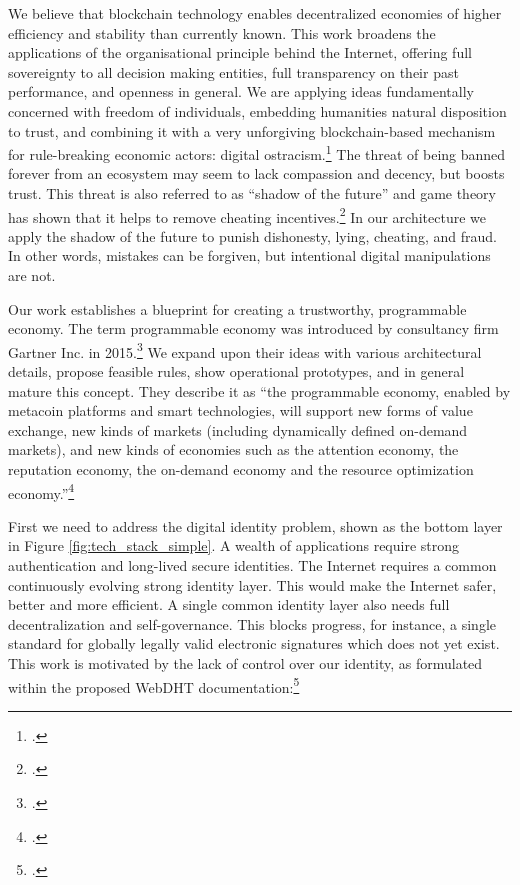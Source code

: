 \documentclass[USenglish]{article}
\begin{document}
We believe that blockchain technology enables decentralized economies of higher efficiency and stability than currently known. 
This work broadens the applications of the organisational principle behind the Internet, offering full sovereignty to all decision making entities, full transparency on their past performance, and openness in general.
We are applying ideas fundamentally concerned with freedom of individuals, embedding humanities natural disposition to trust, and combining it with a very unforgiving blockchain-based mechanism for rule-breaking economic actors: digital ostracism.\footcite{bicchieri2004trust}
The threat of being banned forever from an ecosystem may seem to lack compassion and decency, but boosts trust.
This threat is also referred to as \enquote{shadow of the future} and game theory has shown that it helps to remove cheating incentives.\footcite{friedman1971non}
In our architecture we apply the shadow of the future to punish dishonesty, lying, cheating, and fraud.
In other words, mistakes can be forgiven, but intentional digital manipulations are not.

Our work establishes a blueprint for creating a trustworthy, programmable economy.
The term programmable economy was introduced by consultancy firm Gartner Inc. in 2015.\footcite{gartner2016programmable} 
We expand upon their ideas with various architectural details, propose feasible rules, show operational prototypes, and in general mature this concept.
They describe it as ``the programmable economy, enabled by metacoin platforms and smart technologies, will support new forms of value exchange, new kinds of markets (including dynamically defined on-demand markets), and new kinds of economies such as the attention economy, the reputation economy, the on-demand economy and the resource optimization economy.''\footcite{gartnerprogrammableeconomy}

First we need to address the digital identity problem, shown as the bottom layer in Figure \ref{fig:tech_stack_simple}.
A wealth of applications require strong authentication and long-lived secure identities.
The Internet requires a common continuously evolving strong identity layer.
This would make the Internet safer, better and more efficient.
A single common identity layer also needs full decentralization and self-governance.
This blocks progress, for instance, a single standard for globally legally valid electronic signatures which does not yet exist.
This work is motivated by the lack of control over our identity, as formulated within the proposed WebDHT documentation:\footcite{webdhtproposal}
\end{document}
